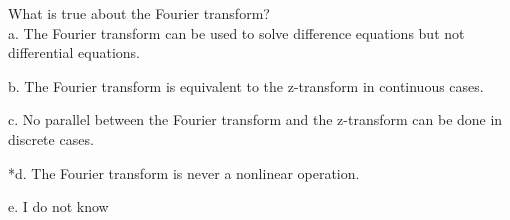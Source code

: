 
What is true about the Fourier transform? \\

a. The Fourier transform can be used to solve difference equations but
not differential equations.

b. The Fourier transform is equivalent to the z-transform in continuous
cases.

c. No parallel between the Fourier transform and the z-transform can be
done in discrete cases.

*d. The Fourier transform is never a nonlinear operation.

e. I do not know \\
